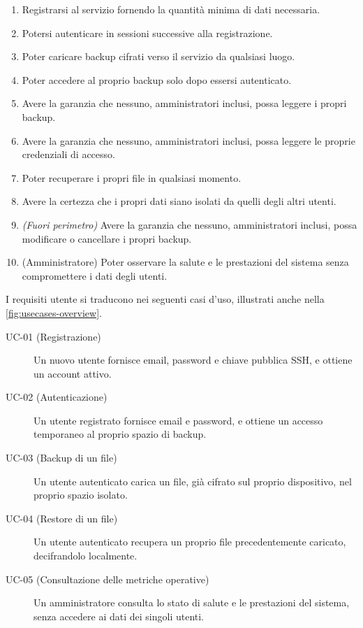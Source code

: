 \begin{enumerate}
    \item[RU-01] Registrarsi al servizio fornendo la quantità minima di dati necessaria.
    \item[RU-02] Potersi autenticare in sessioni successive alla registrazione.
    \item[RU-03] Poter caricare backup cifrati verso il servizio da qualsiasi luogo.
    \item[RU-04] Poter accedere al proprio backup solo dopo essersi autenticato.
    \item[RU-05] Avere la garanzia che nessuno, amministratori inclusi, possa leggere i propri backup.
    \item[RU-06] Avere la garanzia che nessuno, amministratori inclusi, possa leggere le proprie 
    credenziali di accesso.
    \item[RU-07] Poter recuperare i propri file in qualsiasi momento.
    \item[RU-08] Avere la certezza che i propri dati siano isolati da quelli degli altri utenti.
    \item[RU-09] \textit{(Fuori perimetro)} Avere la garanzia che nessuno, amministratori inclusi, possa
    modificare o cancellare i propri backup.
    \item[RU-10] (Amministratore) Poter osservare la salute e le prestazioni del sistema senza 
    compromettere i dati degli utenti.
\end{enumerate}


\newpage

I requisiti utente si traducono nei seguenti casi d'uso, illustrati anche nella \autoref{fig:usecases-overview}.

\begin{description}
    \item[UC-01 (Registrazione)] Un nuovo utente fornisce email, password e chiave pubblica SSH, e
    ottiene un account attivo.
    \item[UC-02 (Autenticazione)] Un utente registrato fornisce email e password, e ottiene un accesso
    temporaneo al proprio spazio di backup.
    \item[UC-03 (Backup di un file)] Un utente autenticato carica un file, già cifrato sul proprio
    dispositivo, nel proprio spazio isolato.
    \item[UC-04 (Restore di un file)] Un utente autenticato recupera un proprio file precedentemente
    caricato, decifrandolo localmente.
    \item[UC-05 (Consultazione delle metriche operative)] Un amministratore consulta lo stato di salute
    e le prestazioni del sistema, senza accedere ai dati dei singoli utenti.
\end{description}

